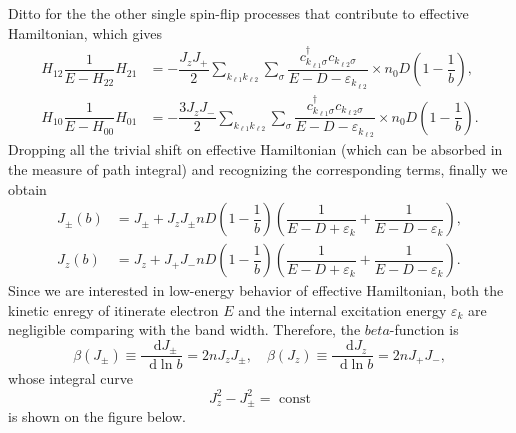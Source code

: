 \documentclass[aps,prx,superscriptaddress,onecolumn,preprintnumbers,nofootinbib,longbibliography]{revtex4-1}
\newcommand*\dd{\mathop{}\!\mathrm{d}}
\begin{document}
		\indent Ditto for the the other single spin-flip processes that contribute to effective Hamiltonian, which gives
		\begin{align}
			H_{12}\dfrac{1}{E-H_{22}}H_{21}&=-\dfrac{J_z J_+}{2}\sum_{k_{\ell1}k_{\ell2}}\sum_\sigma\dfrac{c_{k_{\ell1}\sigma}^\dagger c_{k_{\ell2}\sigma}}{E-D-\varepsilon_{k_{\ell2}}}\times n_0D\left(1-\dfrac{1}{b}\right),\label{3.1.5}\\
			H_{10}\dfrac{1}{E-H_{00}}H_{01}&=-\dfrac{3J_z J_-}{2}\sum_{k_{\ell1}k_{\ell2}}\sum_\sigma\dfrac{c_{k_{\ell1}\sigma}^\dagger c_{k_{\ell2}\sigma}}{E-D-\varepsilon_{k_{\ell2}}}\times n_0D\left(1-\dfrac{1}{b}\right).\label{3.1.6}
		\end{align}
		Dropping all the trivial shift on effective Hamiltonian (which can be absorbed in the measure of path integral) and recognizing the corresponding terms, finally we obtain
		\begin{align}
			J_\pm(b)&=J_\pm+J_zJ_\pm nD\left(1-\dfrac{1}{b}\right)\left(\dfrac{1}{E-D+\varepsilon_k}+\dfrac{1}{E-D- \varepsilon_k}\right),\label{3.1.7}\\
			J_z(b)&=J_z+J_+J_- nD\left(1-\dfrac{1}{b}\right)\left(\dfrac{1}{E-D+\varepsilon_k}+\dfrac{1}{E-D- \varepsilon_k}\right)\label{3.1.8}.
		\end{align}
		Since we are interested in low-energy behavior of effective Hamiltonian, both the kinetic enregy of itinerate electron $E$ and the internal excitation energy $\varepsilon_k$ are negligible comparing with the band width. Therefore, the $beta$-function is
		\begin{equation}\label{3.1.9}
			\boxed{\beta(J_\pm)\equiv\dfrac{\dd J_\pm}{\dd\ln b}=2nJ_zJ_\pm,\quad \beta(J_z)\equiv\dfrac{\dd J_z}{\dd\ln b}=2nJ_+J_-,}
		\end{equation}
		whose integral curve
		\begin{equation}\label{3.1.10}
			J_z^2-J_\pm^2=\text{ const}
		\end{equation}
		is shown on the figure below.
\end{document}
